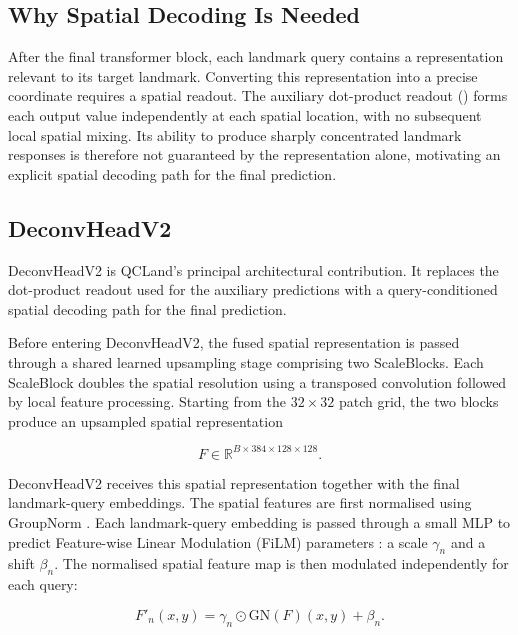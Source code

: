 \subsection{Why Spatial Decoding Is Needed}
\label{sec:method-decoder-motivation}

After the final transformer block, each landmark query contains a
representation relevant to its target landmark. Converting this
representation into a precise coordinate requires a spatial readout.
The auxiliary dot-product readout () forms each
output value independently at each spatial location, with no
subsequent local spatial mixing. Its ability to produce sharply
concentrated landmark responses is therefore not guaranteed by the
representation alone, motivating an explicit spatial decoding path
for the final prediction.


\subsection{DeconvHeadV2}
\label{sec:method-deconvheadv2}

DeconvHeadV2 is QCLand's principal architectural contribution. It
replaces the dot-product readout used for the auxiliary predictions
with a query-conditioned spatial decoding path for the final
prediction.

Before entering DeconvHeadV2, the fused spatial representation is
passed through a shared learned upsampling stage comprising two
ScaleBlocks. Each ScaleBlock doubles the spatial resolution using a
transposed convolution followed by local feature processing. Starting
from the $32 \times 32$ patch grid, the two blocks produce an
upsampled spatial representation

\[
F \in \mathbb{R}^{B \times 384 \times 128 \times 128}.
\]

DeconvHeadV2 receives this spatial representation together with the
final landmark-query embeddings. The spatial features are first
normalised using GroupNorm \parencite{wu2018groupnorm}. Each
landmark-query embedding is passed through a small MLP to predict
Feature-wise Linear Modulation (FiLM) parameters
\parencite{perez2018film}: a scale $\gamma_n$ and a shift $\beta_n$.
The normalised spatial feature map is then modulated independently for
each query:

\begin{equation}
  \label{eq:film-modulation}
  F'_n(x,y)
  =
  \gamma_n
  \odot
  \mathrm{GN}(F)(x,y)
  +
  \beta_n .
\end{equation}

